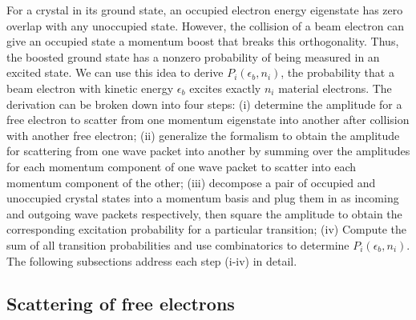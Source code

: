 \documentclass{article}
\begin{document}
For a crystal in its ground state, an occupied electron
energy eigenstate has zero overlap with any unoccupied state.
However, the collision of a beam electron can give an occupied state a
momentum boost that breaks this orthogonality.
Thus, the boosted ground state has a nonzero probability of being measured in
an excited state.
We can use this idea to derive $P_i(\epsilon_b, n_i)$, the probability that a
beam electron with kinetic energy $\epsilon_b$ excites exactly $n_i$ material
electrons.
The derivation can be broken down into four steps:
(i)
determine the amplitude for a free electron to scatter from one momentum
eigenstate into another after collision with another free electron;
(ii)
generalize the formalism to obtain the amplitude for scattering from one wave
packet into another by summing over the amplitudes for each momentum component
of one wave packet to scatter into each momentum component of the other;
(iii)
decompose a pair of occupied and unoccupied crystal states into a momentum
basis and plug them in as incoming and outgoing wave packets respectively, then
square the amplitude to obtain the corresponding excitation probability for a
particular transition;
(iv)
Compute the sum of all transition probabilities and use combinatorics to
determine $P_i(\epsilon_b, n_i)$.
The following subsections address each step (i-iv) in detail.

\subsection{Scattering of free electrons} 
\label{sec:ee}
\end{document}
